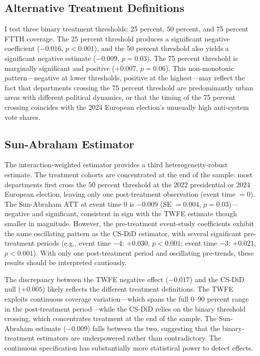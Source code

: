 \documentclass[12pt]{article}
\begin{document}
\subsection{Alternative Treatment Definitions}

I test three binary treatment thresholds: 25 percent, 50 percent, and 75 percent FTTH coverage. The 25 percent threshold produces a significant negative coefficient ($-0.016$, $p < 0.001$), and the 50 percent threshold also yields a significant negative estimate ($-0.009$, $p = 0.03$). The 75 percent threshold is marginally significant and positive ($+0.007$, $p = 0.06$). This non-monotonic pattern---negative at lower thresholds, positive at the highest---may reflect the fact that departments crossing the 75 percent threshold are predominantly urban areas with different political dynamics, or that the timing of the 75 percent crossing coincides with the 2024 European election's unusually high anti-system vote shares.

\subsection{Sun-Abraham Estimator}

The \citet{sun2021estimating} interaction-weighted estimator provides a third heterogeneity-robust estimate. The treatment cohorts are concentrated at the end of the sample: most departments first cross the 50 percent threshold at the 2022 presidential or 2024 European election, leaving only one post-treatment observation (event time $= 0$). The Sun-Abraham ATT at event time 0 is $-0.009$ (SE $= 0.004$, $p = 0.03$)---negative and significant, consistent in sign with the TWFE estimate though smaller in magnitude. However, the pre-treatment event-study coefficients exhibit the same oscillating pattern as the CS-DiD estimator, with several significant pre-treatment periods (e.g., event time $-4$: $+0.030$, $p < 0.001$; event time $-3$: $+0.021$, $p < 0.001$). With only one post-treatment period and oscillating pre-trends, these results should be interpreted cautiously.

The discrepancy between the TWFE negative effect ($-0.017$) and the CS-DiD null ($+0.005$) likely reflects the different treatment definitions. The TWFE exploits continuous coverage variation---which spans the full 0--90 percent range in the post-treatment period---while the CS-DiD relies on the binary threshold crossing, which concentrates treatment at the end of the sample. The Sun-Abraham estimate ($-0.009$) falls between the two, suggesting that the binary-treatment estimators are underpowered rather than contradictory. The continuous specification has substantially more statistical power to detect effects.
\end{document}
